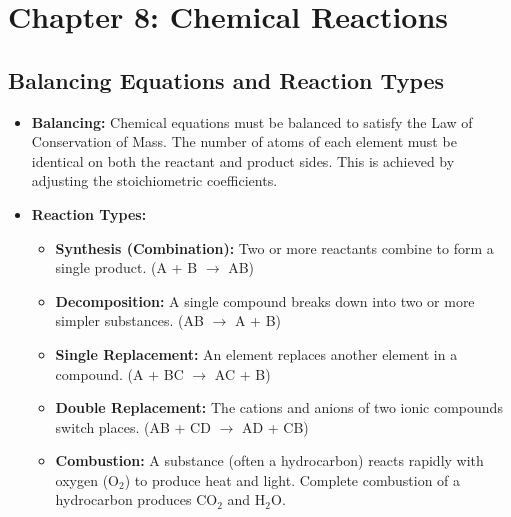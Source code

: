 \documentclass{article}
\begin{document}
\bigskip

\section*{Chapter 8: Chemical Reactions}

\subsection*{Balancing Equations and Reaction Types}
\begin{itemize}[itemsep=5pt]
    \item \textbf{Balancing:} Chemical equations must be balanced to satisfy the Law of Conservation of Mass. The number of atoms of each element must be identical on both the reactant and product sides. This is achieved by adjusting the stoichiometric coefficients.
    \item \textbf{Reaction Types:}
    \begin{itemize}
        \item \textbf{Synthesis (Combination):} Two or more reactants combine to form a single product. (A + B \(\rightarrow\) AB)
        \item \textbf{Decomposition:} A single compound breaks down into two or more simpler substances. (AB \(\rightarrow\) A + B)
        \item \textbf{Single Replacement:} An element replaces another element in a compound. (A + BC \(\rightarrow\) AC + B)
        \item \textbf{Double Replacement:} The cations and anions of two ionic compounds switch places. (AB + CD \(\rightarrow\) AD + CB)
        \item \textbf{Combustion:} A substance (often a hydrocarbon) reacts rapidly with oxygen (O\(_2\)) to produce heat and light. Complete combustion of a hydrocarbon produces CO\(_2\) and H\(_2\)O.
    \end{itemize}
\end{itemize}
\end{document}
